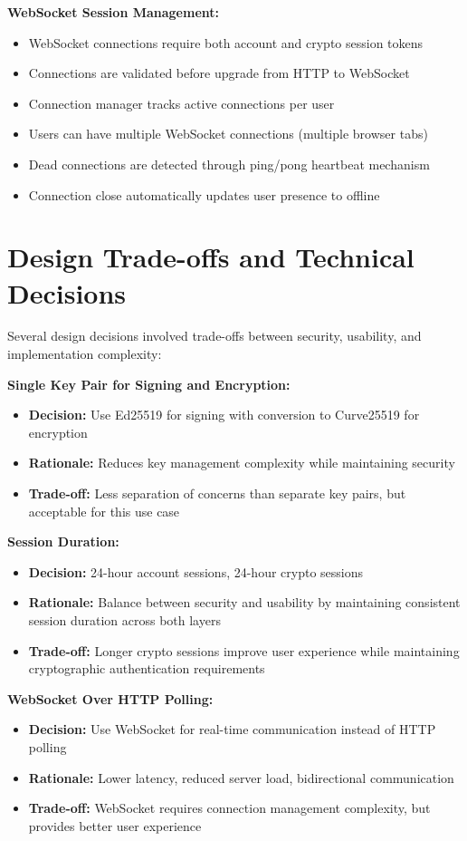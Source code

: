 \documentclass[12pt,a4paper,openany]{book}
\begin{document}
\textbf{WebSocket Session Management:}
\begin{itemize}
\item WebSocket connections require both account and crypto session tokens
\item Connections are validated before upgrade from HTTP to WebSocket
\item Connection manager tracks active connections per user
\item Users can have multiple WebSocket connections (multiple browser tabs)
\item Dead connections are detected through ping/pong heartbeat mechanism
\item Connection close automatically updates user presence to offline
\end{itemize}

\section{Design Trade-offs and Technical Decisions}

Several design decisions involved trade-offs between security, usability, and implementation complexity:

\textbf{Single Key Pair for Signing and Encryption:}
\begin{itemize}
\item \textbf{Decision:} Use Ed25519 for signing with conversion to Curve25519 for encryption
\item \textbf{Rationale:} Reduces key management complexity while maintaining security
\item \textbf{Trade-off:} Less separation of concerns than separate key pairs, but acceptable for this use case
\end{itemize}

\textbf{Session Duration:}
\begin{itemize}
\item \textbf{Decision:} 24-hour account sessions, 24-hour crypto sessions
\item \textbf{Rationale:} Balance between security and usability by maintaining consistent session duration across both layers
\item \textbf{Trade-off:} Longer crypto sessions improve user experience while maintaining cryptographic authentication requirements
\end{itemize}

\textbf{WebSocket Over HTTP Polling:}
\begin{itemize}
\item \textbf{Decision:} Use WebSocket for real-time communication instead of HTTP polling
\item \textbf{Rationale:} Lower latency, reduced server load, bidirectional communication
\item \textbf{Trade-off:} WebSocket requires connection management complexity, but provides better user experience
\end{itemize}
\end{document}
